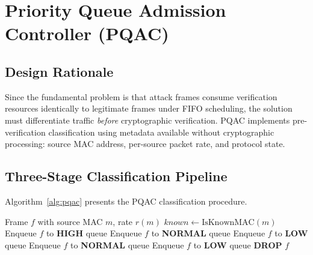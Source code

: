 \documentclass[journal]{IEEEtran}
\begin{document}
\section{Priority Queue Admission Controller (PQAC)}

\subsection{Design Rationale}
Since the fundamental problem is that attack frames consume verification resources identically to legitimate frames under FIFO scheduling, the solution must differentiate traffic \emph{before} cryptographic verification. PQAC implements pre-verification classification using metadata available without cryptographic processing: source MAC address, per-source packet rate, and protocol state.

\subsection{Three-Stage Classification Pipeline}
Algorithm~\ref{alg:pqac} presents the PQAC classification procedure.

\begin{algorithm}[t]
\caption{PQAC Classification Algorithm: Pre-verification traffic triage enables $<$1\,$\mu$s classification overhead, achieving 1,556$\times$ latency improvement over FIFO}
\label{alg:pqac}
\begin{algorithmic}[1]
\REQUIRE Frame $f$ with source MAC $m$, rate $r(m)$
\STATE $\textit{known} \leftarrow \text{IsKnownMAC}(m)$
        \STATE Enqueue $f$ to \textbf{HIGH} queue 
        \STATE Enqueue $f$ to \textbf{NORMAL} queue 
    \ELSE
        \STATE Enqueue $f$ to \textbf{LOW} queue 
    \ENDIF
\ELSE
        \STATE Enqueue $f$ to \textbf{NORMAL} queue 
    \ELSE
            \STATE Enqueue $f$ to \textbf{LOW} queue 
        \ELSE
            \STATE \textbf{DROP} $f$ 
        \ENDIF
    \ENDIF
\ENDIF
\end{algorithmic}
\end{algorithm}
\end{document}

